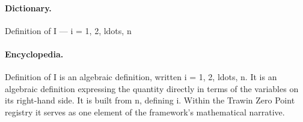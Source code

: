 \paragraph{Dictionary.}
Definition of I — i = 1, 2, ldots, n

\paragraph{Encyclopedia.}
Definition of I is an algebraic definition, written i = 1, 2, ldots, n. It is an algebraic definition expressing the quantity directly in terms of the variables on its right-hand side. It is built from n, defining i. Within the Trawin Zero Point registry it serves as one element of the framework's mathematical narrative.
